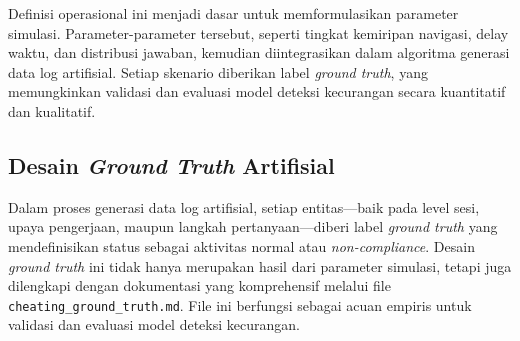 Definisi operasional ini menjadi dasar untuk memformulasikan parameter simulasi. Parameter-parameter tersebut, seperti tingkat kemiripan navigasi, delay waktu, dan distribusi jawaban, kemudian diintegrasikan dalam algoritma generasi data log artifisial. Setiap skenario diberikan label \textit{ground truth}, yang memungkinkan validasi dan evaluasi model deteksi kecurangan secara kuantitatif dan kualitatif.

\subsection{Desain \textit{Ground Truth} Artifisial}
\label{sec:desainGroundTruthArtifisial}
Dalam proses generasi data log artifisial, setiap entitas---baik pada level sesi, upaya pengerjaan, maupun langkah pertanyaan---diberi label \textit{ground truth} yang mendefinisikan status sebagai aktivitas normal atau \textit{non-compliance}. Desain \textit{ground truth} ini tidak hanya merupakan hasil dari parameter simulasi, tetapi juga dilengkapi dengan dokumentasi yang komprehensif melalui file \texttt{cheating\_ground\_truth.md}. File ini berfungsi sebagai acuan empiris untuk validasi dan evaluasi model deteksi kecurangan.

